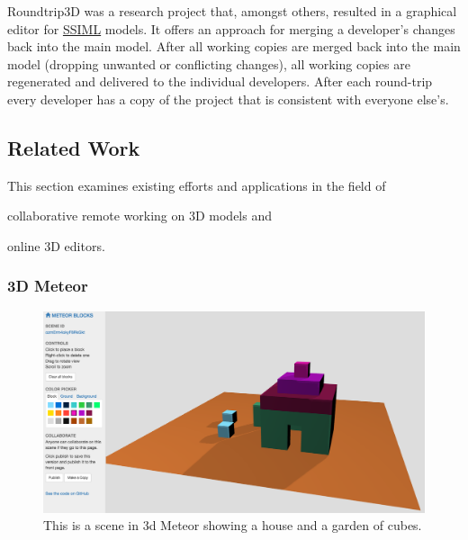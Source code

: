 Roundtrip3D was a research project that, amongst others, resulted in a
graphical editor for \hyperref[ssiml]{SSIML} models. It offers an
approach for merging a developer's changes back into the main model.
After all working copies are merged back into the main model (dropping
unwanted or conflicting changes), all working copies are regenerated and
delivered to the individual developers. After each round-trip every
developer has a copy of the project that is consistent with everyone
else's.

\subsection{Related Work}
\label{related-work}

This section examines existing efforts and applications in the field of

\begin{itemize*}
  \item collaborative remote working on \gls{3D} models and
  \item online \gls{3D} editors.
\end{itemize*}

\subsubsection{3D Meteor}
\label{d-meteor0}

\begin{figure}[htbp]
  \centering
  \includegraphics[width=12cm]{../assets/3dmeteor.png}
  \caption{This is a scene in 3d Meteor showing a house and a garden of cubes.}
	\label{fig:3dmeteor}
\end{figure}


